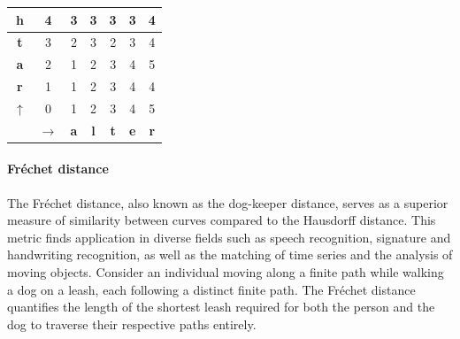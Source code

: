 \begin{example}
\begin{table}[H]
\begin{tabular}{c|c|c|c|c|c|c|}
        \multicolumn{1}{|c|}{\textbf{h}}          & 4                      & 3          & 3          & 3          & 3          & 4          \\ \hline
        \multicolumn{1}{|c|}{\textbf{t}}          & 3                      & 2          & 3          & 2          & 3          & 4          \\ \hline
        \multicolumn{1}{|c|}{\textbf{a}}          & 2                      & 1          & 2          & 3          & 4          & 5          \\ \hline
        \multicolumn{1}{|c|}{\textbf{r}}          & 1                      & 1          & 2          & 3          & 4          & 4          \\ \hline
        \multicolumn{1}{|c|}{$\uparrow$}          & 0                      & 1          & 2          & 3          & 4          & 5          \\ \hline
                                                  & $\rightarrow$          & \textbf{a} & \textbf{l} & \textbf{t} & \textbf{e} & \textbf{r} \\ \cline{2-7} 
        \end{tabular}
    \end{table}
\end{example}

\paragraph*{Fréchet distance}
The Fréchet distance, also known as the dog-keeper distance, serves as a superior measure of similarity between curves compared to the Hausdorff distance. 
This metric finds application in diverse fields such as speech recognition, signature and handwriting recognition, as well as the matching of time series and the analysis of moving objects.
Consider an individual moving along a finite path while walking a dog on a leash, each following a distinct finite path. 
The Fréchet distance quantifies the length of the shortest leash required for both the person and the dog to traverse their respective paths entirely.

